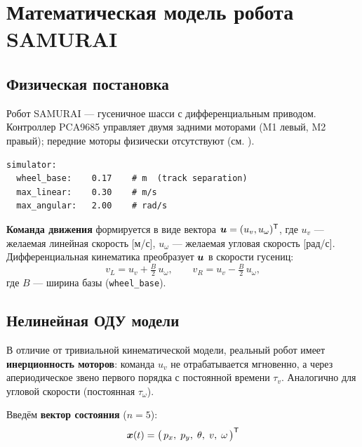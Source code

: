 \chapter{Математическая модель робота SAMURAI}
\label{ch:model}

\section{Физическая постановка}
\label{sec:physical}

Робот SAMURAI --- гусеничное шасси с дифференциальным приводом.
Контроллер PCA9685 управляет двумя задними моторами (M1 левый, M2 правый);
передние моторы физически отсутствуют (см. ).

\begin{filebox}[title={Параметры объекта (\filepath{config.yaml})}]
\begin{verbatim}
simulator:
  wheel_base:    0.17    # m  (track separation)
  max_linear:    0.30    # m/s
  max_angular:   2.00    # rad/s
\end{verbatim}
\end{filebox}

\textbf{Команда движения} формируется в виде вектора $\bm{u} = (u_v, u_\omega)^{\mathsf{T}}$,
где $u_v$ --- желаемая линейная скорость [м/с], $u_\omega$ --- желаемая
угловая скорость [рад/с]. Дифференциальная кинематика преобразует $\bm{u}$
в скорости гусениц:
\begin{equation}
  v_L = u_v + \tfrac{B}{2}\,u_\omega, \qquad
  v_R = u_v - \tfrac{B}{2}\,u_\omega,
  \label{eq:diff_kinematics}
\end{equation}
где $B$ --- ширина базы (\texttt{wheel\_base}).

\section{Нелинейная ОДУ модели}
\label{sec:ode}

В отличие от тривиальной кинематической модели, реальный робот имеет
\textbf{инерционность моторов}: команда $u_v$ не отрабатывается мгновенно,
а через апериодическое звено первого порядка с постоянной времени $\tau_v$.
Аналогично для угловой скорости (постоянная $\tau_\omega$).

Введём \textbf{вектор состояния} ($n=5$):
\begin{equation}
  \bm{x}(t) = \big(\,p_x,\; p_y,\; \theta,\; v,\; \omega\,\big)^{\mathsf{T}}
  \label{eq:state_vector}
\end{equation}

